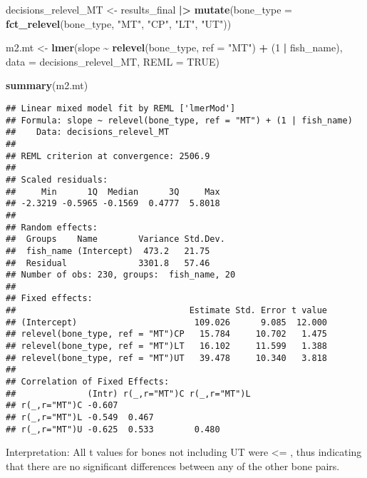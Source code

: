 \documentclass[
]{article}
\newenvironment{Shaded}{\begin{snugshade}}{\end{snugshade}}
\newcommand{\AttributeTok}[1]{\textcolor[rgb]{0.13,0.29,0.53}{#1}}
\newcommand{\ConstantTok}[1]{\textcolor[rgb]{0.56,0.35,0.01}{#1}}
\newcommand{\DecValTok}[1]{\textcolor[rgb]{0.00,0.00,0.81}{#1}}
\newcommand{\FunctionTok}[1]{\textcolor[rgb]{0.13,0.29,0.53}{\textbf{#1}}}
\newcommand{\NormalTok}[1]{#1}
\newcommand{\OtherTok}[1]{\textcolor[rgb]{0.56,0.35,0.01}{#1}}
\newcommand{\SpecialCharTok}[1]{\textcolor[rgb]{0.81,0.36,0.00}{\textbf{#1}}}
\newcommand{\StringTok}[1]{\textcolor[rgb]{0.31,0.60,0.02}{#1}}
\begin{document}
\begin{Shaded}
\begin{Highlighting}[]
\NormalTok{decisions\_relevel\_MT }\OtherTok{\textless{}{-}}\NormalTok{ results\_final }\SpecialCharTok{|\textgreater{}}
   \FunctionTok{mutate}\NormalTok{(}\AttributeTok{bone\_type =} \FunctionTok{fct\_relevel}\NormalTok{(bone\_type, }\StringTok{"MT"}\NormalTok{, }\StringTok{"CP"}\NormalTok{, }\StringTok{"LT"}\NormalTok{, }\StringTok{"UT"}\NormalTok{))}

\NormalTok{m2.mt }\OtherTok{\textless{}{-}} \FunctionTok{lmer}\NormalTok{(slope }\SpecialCharTok{\textasciitilde{}}  \FunctionTok{relevel}\NormalTok{(bone\_type, }\AttributeTok{ref =} \StringTok{"MT"}\NormalTok{) }\SpecialCharTok{+}\NormalTok{ (}\DecValTok{1} \SpecialCharTok{|}\NormalTok{ fish\_name), }\AttributeTok{data =}\NormalTok{ decisions\_relevel\_MT, }\AttributeTok{REML =} \ConstantTok{TRUE}\NormalTok{)}

\FunctionTok{summary}\NormalTok{(m2.mt)}
\end{Highlighting}
\end{Shaded}

\begin{verbatim}
## Linear mixed model fit by REML ['lmerMod']
## Formula: slope ~ relevel(bone_type, ref = "MT") + (1 | fish_name)
##    Data: decisions_relevel_MT
## 
## REML criterion at convergence: 2506.9
## 
## Scaled residuals: 
##     Min      1Q  Median      3Q     Max 
## -2.3219 -0.5965 -0.1569  0.4777  5.8018 
## 
## Random effects:
##  Groups    Name        Variance Std.Dev.
##  fish_name (Intercept)  473.2   21.75   
##  Residual              3301.8   57.46   
## Number of obs: 230, groups:  fish_name, 20
## 
## Fixed effects:
##                                  Estimate Std. Error t value
## (Intercept)                       109.026      9.085  12.000
## relevel(bone_type, ref = "MT")CP   15.784     10.702   1.475
## relevel(bone_type, ref = "MT")LT   16.102     11.599   1.388
## relevel(bone_type, ref = "MT")UT   39.478     10.340   3.818
## 
## Correlation of Fixed Effects:
##              (Intr) r(_,r="MT")C r(_,r="MT")L
## r(_,r="MT")C -0.607                          
## r(_,r="MT")L -0.549  0.467                   
## r(_,r="MT")U -0.625  0.533        0.480
\end{verbatim}

Interpretation: All t values for bones not including UT were \textless=
\textbar, thus indicating that there are no significant
differences between any of the other bone pairs.
\end{document}

